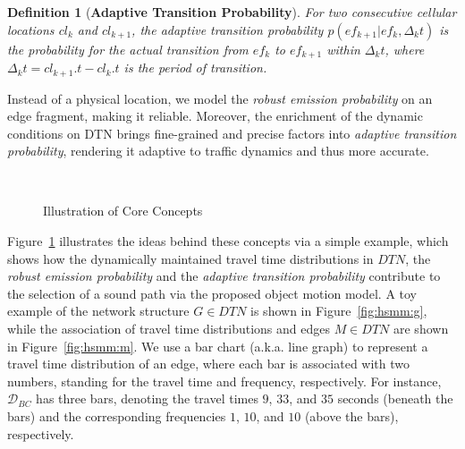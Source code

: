 \documentclass{vldb}
\newtheorem{definition}{Definition}
\begin{document}
	\begin{definition}[\textbf{Adaptive Transition Probability}]
		For two consecutive cellular locations $cl_k$ and $cl_{k+1}$, the adaptive transition probability $p(ef_{k+1}|ef_k,\Delta_k t)$ is the probability for the actual transition from $ef_{k}$ to $ef_{k+1}$ within $\Delta_k t$, where $\Delta_k t=cl_{k+1}.t-cl_{k}.t$ is the period of transition.
	\end{definition}
	
	Instead of a physical location, we model the {\em robust emission probability} on an edge fragment, making it reliable. Moreover, the enrichment of the dynamic conditions
	on DTN brings fine-grained and precise factors into {\em adaptive transition probability}, rendering it adaptive to traffic dynamics and thus more accurate. 
	
	\begin{figure}[!htb]
		\centering
		\vspace{-10pt}
		\\
		\vspace{-5pt}
		\caption{Illustration of Core Concepts}
		\vspace{-5pt}
		\label{fig:hsmm}  %
	\end{figure}
	
	Figure~\ref{fig:hsmm} illustrates the ideas behind these concepts via a simple example, which shows how the dynamically maintained travel time distributions in $DTN$, the {\em robust emission probability} and the {\em adaptive transition probability} contribute to the selection of a sound path via the proposed object motion model. 
	A toy example of the network structure $G\in DTN$ is shown in Figure~\ref{fig:hsmm:g}, while the association of travel time distributions and edges $M\in DTN$ are shown in Figure~\ref{fig:hsmm:m}.
	We use a bar chart (a.k.a. line graph) to represent a travel time distribution of an edge, where each bar is associated with two numbers, standing for the travel time and frequency, respectively.
	For instance, $\mathcal{D}_{BC}$ has three bars, denoting the travel times $9$, $33$, and $35$ seconds (beneath the bars) and the corresponding frequencies $1$, $10$, and $10$ (above the bars), respectively.
	
\end{document}
